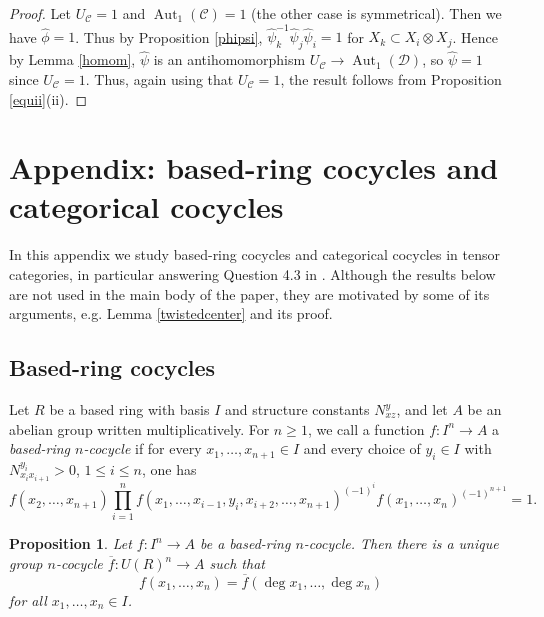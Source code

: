 \documentclass[12pt]{amsart}
\numberwithin{equation}{section}
\newtheorem{proposition}[theorem]{Proposition}
\theoremstyle{definition}
\newcommand{\Aut}{\text{Aut}}
\newcommand{\1}{_{(1)}}
\newcommand{\2}{_{(2)}}
\newcommand{\3}{_{(3)}}
\newcommand{\4}{_{(4)}}
\newcommand{\5}{_{(5)}}
\newcommand{\6}{_{(6)}}
\newcommand{\C}{\mathcal{C}}
\theoremstyle{plain}
\theoremstyle{definition}
\theoremstyle{remark}
\def\C{\mathcal{C}}
\def\D{\mathcal{D}}
\def\Aut{\mathop{\mathrm{Aut}}\nolimits}
\begin{document}
\begin{proof} Let $U_\C=1$ and $\Aut_1(\C)=1$ (the other case is symmetrical). 
Then we have $\widehat\phi=1$. Thus by Proposition \ref{phipsi}, $\widehat \psi_k^{-1}\widehat \psi_j\widehat \psi_i=1$ for $X_k\subset X_i\otimes X_j$.
Hence by Lemma \ref{homom}, $\widehat \psi$ is an antihomomorphism $U_\C\to \Aut_1(\D)$, so $\widehat \psi=1$ since $U_\C=1$. Thus, again using that $U_\C=1$, the result follows from Proposition \ref{equii}(ii). 
\end{proof} 

\section{Appendix: based-ring cocycles and categorical cocycles} 

In this appendix we study based-ring cocycles and categorical cocycles
 in tensor categories, in particular answering Question 4.3 in \cite{JOY}. Although the results below are not used in the main body of the paper, they are motivated 
by some of its arguments, e.g. Lemma \ref{twistedcenter} and its proof. 

\subsection{Based-ring cocycles} 
Let $R$ be a based ring with basis $I$ and structure constants $N_{xz}^y$, and let 
$A$ be an abelian group written multiplicatively. For $n\ge 1$, we call a function
$f:I^n\to A$ a \emph{based-ring $n$-cocycle} if for every $x_1,\ldots,x_{n+1}\in I$ and every choice of $y_i\in I$ with $N^{y_i}_{x_ix_{i+1}}>0$, $1\le i\le n$, one has \scriptsize
\begin{equation}\label{frcocycle}
 f(x_2,\ldots,x_{n+1})
 \prod_{i=1}^{n}
 f(x_1,\ldots,x_{i-1},y_i,x_{i+2},\ldots,x_{n+1})^{(-1)^{i}}
 f(x_1,\ldots,x_{n})^{(-1)^{n+1}}=1 .
\end{equation} \normalsize

\begin{proposition}\label{anydegreecocycle} Let $f:I^n\to A$ be a based-ring $n$-cocycle. Then there is a unique group $n$-cocycle
$\overline f:U(R)^n\to A$
such that
$$
 f(x_1,\ldots,x_n)=\overline f(\deg x_1,\ldots,\deg x_n)
$$
for all $x_1,\ldots,x_n\in I$.
\end{proposition}
\end{document}
